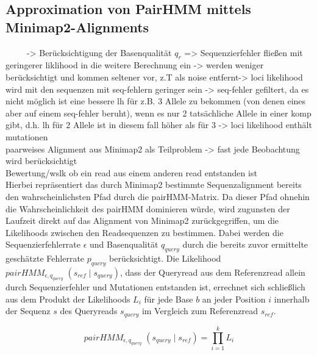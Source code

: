 \subsection{Approximation von PairHMM mittels Minimap2-Alignments} \label{subsec:phmm_minimap}

~\cite{yoon_2009}
~\cite{knudsen_2003}
~\cite{durbin_1998}
-> Berücksichtigung der Basenqualität $q_{r}$ => Sequenzierfehler fließen mit geringerer liklihood in die weitere Berechnung ein -> werden weniger berücksichtigt und kommen seltener vor, z.T als noise entfernt-> loci likelihood wird mit den sequenzen mit seq-fehlern geringer sein -> seq-fehler gefiltert, da es nicht möglich ist eine  bessere lh für z.B. 3 Allele zu bekommen (von denen eines aber auf einem seq-fehler beruht), wenn es nur 2 tatsächliche Allele in einer komp gibt, d.h. lh für 2 Allele ist in diesem fall höher als für 3 -> loci likelihood enthält mutationen \\
paarweises Alignment aus Minimap2 als Teilproblem -> fast jede Beobachtung wird berücksichtigt\\
Bewertung/wslk ob ein read aus einem anderen read entstanden ist\\

Hierbei repräsentiert das durch Minimap2 bestimmte Sequenzalignment bereits den wahrscheinlichsten Pfad durch die pairHMM-Matrix. Da dieser Pfad ohnehin die Wahrscheinlichkeit des pairHMM dominieren würde, wird zugunsten der Laufzeit direkt auf das Alignment von Minimap2 zurückgegriffen, um die Likelihoods zwischen den Readsequenzen zu bestimmen. Dabei werden die Sequenzierfehlerrate $ \epsilon $ und Basenqualität $ q_{query} $ durch die bereits zuvor ermittelte geschätzte Fehlerrate $ p_{query} $ berücksichtigt. Die Likelihood $ pairHMM_{\epsilon, q_{query}} \;(s_{ref}\;|\; s_{query}) $, dass der Queryread aus dem Referenzread allein durch Sequenzierfehler und Mutationen entstanden ist, errechnet sich schließlich aus dem Produkt der Likelihoods $ L_{i} $ für jede Base $ b $ an jeder Position $ i $ innerhalb der Sequenz $ s $ des Queryreads $ s_{query} $ im Vergleich zum Referenzread $ s_{ref} $.
 
\begin{equation} \label{eqn:2-5}
\tag{2-5}
pairHMM_{\epsilon, q_{query}} \;(s_{query}\;|\; s_{ref}) = \prod_{i=1}^{k}L_{i}
\end{equation}

